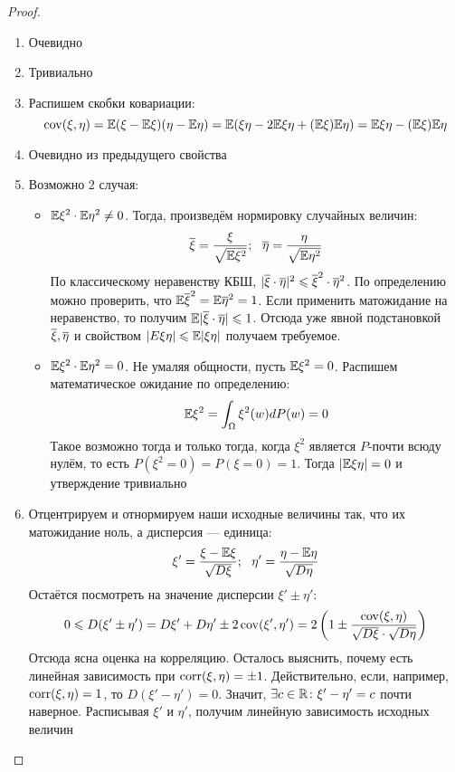 \begin{proof}~
	\begin{enumerate}
		\item Очевидно
		
		\item Тривиально
		
		\item Распишем скобки ковариации:
		\[
			\operatorname{cov}(\xi, \eta) = \mathbb{E}(\xi - \mathbb{E}\xi)(\eta - \mathbb{E}\eta) = \mathbb{E}(\xi\eta - 2\mathbb{E}\xi\eta + (\mathbb{E}\xi)\mathbb{E}\eta) = \mathbb{E}\xi\eta - (\mathbb{E}\xi)\mathbb{E}\eta
		\]
		
		\item Очевидно из предыдущего свойства
		
		\item Возможно 2 случая:
		\begin{itemize}
			\item $\mathbb{E}\xi^2 \cdot \mathbb{E}\eta^2 \neq 0$. Тогда, произведём нормировку случайных величин:
			\[
				\ol{\xi} = \frac{\xi}{\sqrt{\E\xi^2}};\ \ \ol{\eta} = \frac{\eta}{\sqrt{\E\eta^2}}
			\]
			По классическому неравенству КБШ, \(|\overline{\xi} \cdot \overline{\eta}|^2 \leqslant \overline{\xi}^2 \cdot \overline{\eta}^2\). По определению можно проверить, что $\mathbb{E}\overline{\xi}^2 = \mathbb{E}\overline{\eta}^2 = 1$. Если применить матожидание на неравенство, то получим $\mathbb{E}|\overline{\xi} \cdot \overline{\eta}| \leqslant 1$. Отсюда уже явной подстановкой $\overline{\xi}, \overline{\eta}$ и свойством $|E\xi\eta| \leqslant \mathbb{E}|\xi\eta|$ получаем требуемое.
			
			\item $\mathbb{E}\xi^2 \cdot \mathbb{E}\eta^2 = 0$. Не умаляя общности, пусть $\mathbb{E}\xi^2 = 0$. Распишем математическое ожидание по определению:
			\[
				\mathbb{E}\xi^2 = \int_\Omega \xi^2(w)dP(w) = 0
			\]
			Такое возможно тогда и только тогда, когда $\xi^2$ является $P$-почти всюду нулём, то есть $P(\xi^2 = 0) = P(\xi = 0) = 1$. Тогда $|\mathbb{E}\xi\eta| = 0$ и утверждение тривиально
		\end{itemize}
	
		\item Отцентрируем и отнормируем наши исходные величины так, что их матожидание ноль, а дисперсия --- единица:
		\[
			\xi' = \frac{\xi - \mathbb{E}\xi}{\sqrt{D\xi}};\ \ \eta' = \frac{\eta - \mathbb{E}\eta}{\sqrt{D\eta}}
		\]
		Остаётся посмотреть на значение дисперсии $\xi' \pm \eta'$:
		\[
			0 \leqslant D(\xi' \pm \eta') = D\xi' + D\eta' \pm 2\operatorname{cov}(\xi', \eta') = 2\left(1 \pm \frac{\operatorname{cov}(\xi, \eta)}{\sqrt{D\xi} \cdot \sqrt{D\eta}}\right)
		\]
		Отсюда ясна оценка на корреляцию. Осталось выяснить, почему есть линейная зависимость при $\operatorname{corr}(\xi, \eta) = \pm 1$. Действительно, если, например, $\operatorname{corr}(\xi, \eta) = 1$, то $D(\xi' - \eta') = 0$. Значит, $\exists c \in \mathbb{R} \colon \xi' - \eta' = c$ почти наверное. Расписывая $\xi'$ и $\eta'$, получим линейную зависимость исходных величин
	\end{enumerate}
\end{proof}

